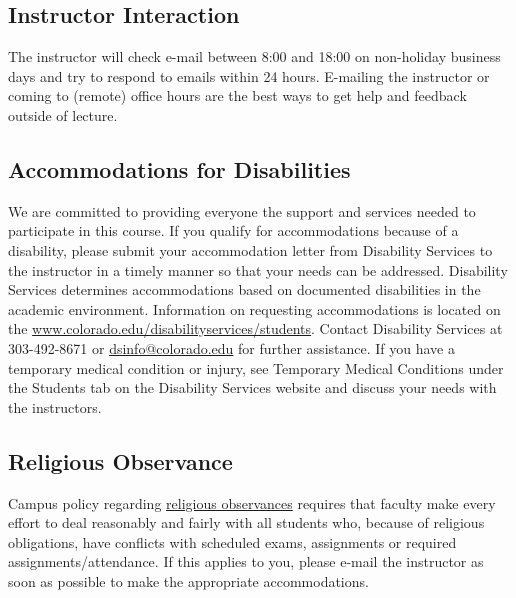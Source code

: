 \documentclass[10pt]{memoir}
\begin{document}

\subsection{Instructor Interaction}
The instructor will check e-mail between 8:00 and 18:00 on non-holiday business days and try to respond to emails within 24 hours. E-mailing the instructor or coming to (remote) office hours are the best ways to get help and feedback outside of lecture.

\subsection{Accommodations for Disabilities}
We are committed to providing everyone the support and services needed to participate in this course. If you qualify for accommodations because of a disability, please submit your accommodation letter from Disability Services to the instructor in a timely manner so that your needs can be addressed. Disability Services determines accommodations based on documented disabilities in the academic environment. Information on requesting accommodations is located on the \href{Disability Services website}{www.colorado.edu/disabilityservices/students}. Contact Disability Services at 303-492-8671 or \href{mailto:dsinfo@colorado.edu}{dsinfo@colorado.edu} for further assistance. If you have a temporary medical condition or injury, see Temporary Medical Conditions under the Students tab on the Disability Services website and discuss your needs with the instructors.

\subsection{Religious Observance}
Campus policy regarding \href{http://www.colorado.edu/policies/observance-religious-holidays-and-absences-classes-andor-exams}{religious observances} requires that faculty make every effort to deal reasonably and fairly with all students who, because of religious obligations, have conflicts with scheduled exams, assignments or required assignments/attendance. If this applies to you, please e-mail the instructor as soon as possible to make the appropriate accommodations.
\end{document}
